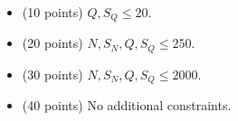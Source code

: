 \documentclass[12pt]{scrartcl}
\begin{document}

    \begin{itemize}
        \item (10 points) $Q, S_Q \le 20$.
        \item (20 points) $N, S_N, Q, S_Q \le 250$.
        \item (30 points) $N, S_N, Q, S_Q \le 2000$.
        \item (40 points) No additional constraints.
    \end{itemize}
\end{document}
